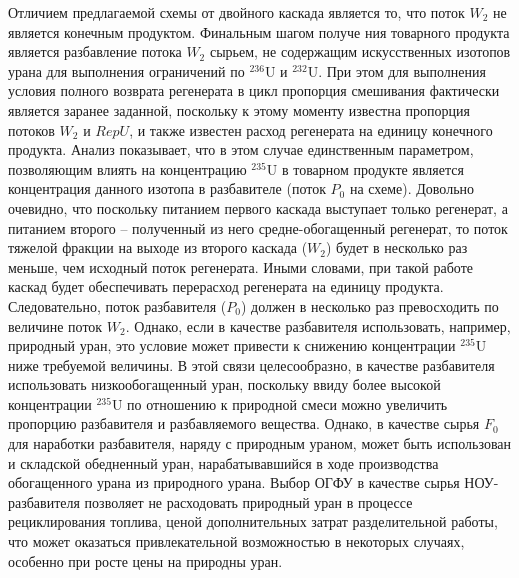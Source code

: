 Отличием предлагаемой схемы от двойного каскада является то, что поток $W_2$ не является конечным продуктом. Финальным шагом получе ния товарного продукта является разбавление потока $W_2$ сырьем, не содержащим искусственных изотопов урана для выполнения ограничений по $^{236}$U и $^{232}$U. При этом для выполнения условия полного возврата регенерата в цикл пропорция смешивания фактически является заранее заданной, поскольку к этому моменту известна пропорция потоков $W_2$ и $RepU$, и также известен расход регенерата на единицу конечного продукта. Анализ показывает, что в этом случае единственным параметром, позволяющим влиять на концентрацию $^{235}$U в товарном продукте является концентрация данного изотопа в разбавителе (поток $P_{0}$ на схеме). Довольно очевидно, что поскольку питанием первого каскада выступает только регенерат, а питанием второго -- полученный из него средне-обогащенный регенерат, то поток тяжелой фракции на выходе из второго каскада ($W_2$) будет в несколько раз меньше, чем исходный поток регенерата. Иными словами, при такой работе каскад будет обеспечивать перерасход регенерата на единицу продукта. Следовательно, поток разбавителя ($P_{0}$) должен в несколько раз превосходить по величине поток $W_2$. Однако, если в качестве разбавителя использовать, например, природный уран, это условие может привести к снижению концентрации $^{235}$U ниже требуемой величины. В этой связи целесообразно, в качестве разбавителя использовать низкообогащенный уран, поскольку ввиду более высокой концентрации $^{235}$U по отношению к природной смеси можно увеличить пропорцию разбавителя и разбавляемого вещества. Однако, в качестве сырья $F_0$ для наработки разбавителя, наряду с природным ураном, может быть использован и складской обедненный уран, нарабатывавшийся в ходе производства обогащенного урана из природного урана. Выбор ОГФУ в качестве сырья НОУ-разбавителя позволяет не расходовать природный уран в процессе рециклирования топлива, ценой дополнительных затрат разделительной работы, что может оказаться привлекательной возможностью в некоторых случаях, особенно при росте цены на природны уран.


